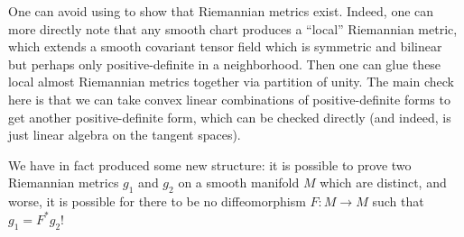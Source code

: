 \documentclass[../notes.tex]{subfiles}
\begin{document}
\begin{remark}
	One can avoid using  to show that Riemannian metrics exist. Indeed, one can more directly note that any smooth chart produces a ``local'' Riemannian metric, which extends a smooth covariant tensor field which is symmetric and bilinear but perhaps only positive-definite in a neighborhood. Then one can glue these local almost Riemannian metrics together via partition of unity. The main check here is that we can take convex linear combinations of positive-definite forms to get another positive-definite form, which can be checked directly (and indeed, is just linear algebra on the tangent spaces).
\end{remark}
\begin{remark}
	We have in fact produced some new structure: it is possible to prove two Riemannian metrics $g_1$ and $g_2$ on a smooth manifold $M$ which are distinct, and worse, it is possible for there to be no diffeomorphism $F\colon M\to M$ such that $g_1=F^*g_2$!
\end{remark}
\end{document}
